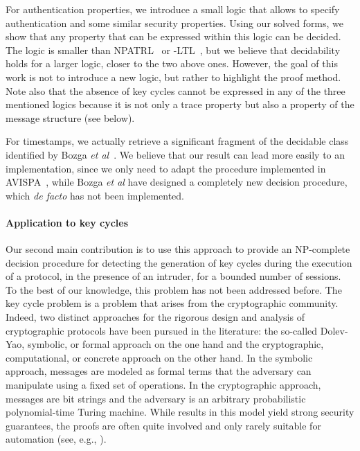 \documentclass[acmtocl,acmnow]{acmtrans2m}
\newcommand{\avispa}{AVISPA}
\begin{document}
For authentication properties, we introduce a small logic that allows
to specify authentication and some similar security properties.  Using
our solved forms, we show that any property that can be
expressed within this logic can be decided.  The logic is smaller than
NPATRL~\cite{SyversonM96} or
-LTL~\cite{corin-psltl,Corin-thesis}, but we believe
that decidability holds for a larger logic, closer to the two
above ones. However, the goal of this work is not to introduce a new logic,
but rather to highlight the proof method. Note also that the absence
of key cycles cannot be expressed in any of the three mentioned logics
because it is not only a trace property but also a property of the
message structure (see below).


For timestamps, we actually retrieve a significant fragment of
the decidable class identified by Bozga \textit{et al}~\cite{BEL04concur}.
We believe that our result can lead more easily to an implementation, since
we only need to adapt the procedure implemented in
\avispa~\cite{avispa2005}, while Bozga \textit{et al} have designed a
completely new decision procedure, which \textit{de facto} has not been implemented.


\paragraph{Application to key cycles} 
Our second main contribution is to use this approach to provide an
NP-complete decision procedure for detecting the generation of key
cycles during the execution of a protocol, in the presence of an
intruder, for a bounded number of sessions. To the best of our
knowledge, this problem has not been addressed before. The key cycle
problem is a problem that arises from the cryptographic community.
Indeed, two distinct approaches for the rigorous design and analysis
of cryptographic protocols have been pursued in the literature: the
so-called Dolev-Yao, symbolic, or formal approach on the one hand and
the cryptographic, computational, or concrete approach on the other
hand. In the symbolic approach, messages are modeled as formal terms
that the adversary can manipulate using a fixed set of operations. In
the cryptographic approach, messages are bit strings and the adversary
is an arbitrary probabilistic polynomial-time Turing machine. While
results in this model yield strong security guarantees, the proofs are
often quite involved and only rarely suitable for automation (see,
e.g.,
\cite{Goldwasser_Micali_JCSS84_probabilistic_encryption,BellareRogaway-CRYPTO-1993}).
\end{document}
